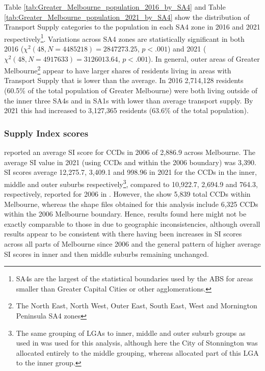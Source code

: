 \documentclass[preprint, 3p,
authoryear]{elsarticle} %
\begin{document}
Table \ref{tab:Greater_Melbourne_population_2016_by_SA4} and Table
\ref{tab:Greater_Melbourne_population_2021_by_SA4} show the distribution
of Transport Supply categories to the population in each SA4 zone in
2016 and 2021 respectively\footnote{SA4s are the largest of the
  statistical boundaries used by the ABS for areas smaller than Greater
  Capital Cities or other agglomerations.}. Variations across SA4 zones
are statistically significant in both 2016
(\(\chi^2(48, N = 4485218) = 2847273.25\), \(p < .001\)) and 2021
(\(\chi^2(48, N = 4917633) = 3126013.64\), \(p < .001\)). In general,
outer areas of Greater Melbourne\footnote{The North East, North West,
  Outer East, South East, West and Mornington Peninsula SA4 zones}
appear to have larger shares of residents living in areas with Transport
Supply that is lower than the average. In 2016 2,714,128 residents
(60.5\% of the total population of Greater Melbourne) were both living
outside of the inner three SA4s and in SA1s with lower than average
transport supply. By 2021 this had increased to 3,127,365 residents
(63.6\% of the total population).

\subsubsection{Supply Index scores}\label{supply-index-scores}

\citet{currie2010identifying} reported an average SI score for CCDs in
2006 of 2,886.9 across Melbourne. The average SI value in 2021 (using
CCDs and within the 2006 boundary) was 3,390. SI scores average
12,275.7, 3,409.1 and 998.96 in 2021 for the CCDs in the inner, middle
and outer suburbs respectively\footnote{The same grouping of LGAs to
  inner, middle and outer suburb groups as used in
  \citet{currie2010identifying} was used for this analysis, although
  here the City of Stonnington was allocated entirely to the middle
  grouping, whereas \citet{currie2010identifying} allocated part of this
  LGA to the inner group.}, compared to 10,922.7, 2,694.9 and 764.3,
respectively, reported for 2006 in \citet{currie2010identifying}.
However, the \citet{currie2010identifying} show 5,839 total CCDs within
Melbourne, whereas the shape files obtained for this analysis include
6,325 CCDs within the 2006 Melbourne boundary. Hence, results found here
might not be exactly comparable to those in
\citet{currie2010identifying} due to geographic inconsistencies,
although overall results appear to be consistent with there having been
increases in SI scores across all parts of Melbourne since 2006 and the
general pattern of higher average SI scores in inner and then middle
suburbs remaining unchanged.
\end{document}
